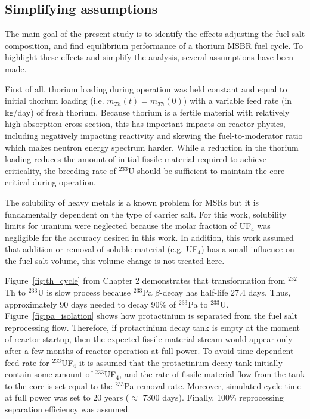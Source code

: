 \subsection{Simplifying assumptions}
The main goal of the present study is to identify the effects adjusting the fuel salt composition, and find equilibrium performance of a thorium \gls{MSBR} fuel cycle. To highlight these effects and simplify the analysis, several assumptions have been made.

First of all, thorium loading during operation was held constant and equal to initial thorium loading (i.e. $m_{Th}(t)=m_{Th}(0)$) with a variable feed rate (in kg/day) of fresh thorium. Because thorium is a fertile material with relatively high absorption cross section, this has important impacts on reactor physics, including negatively impacting reactivity and skewing the fuel-to-moderator ratio which makes neutron energy spectrum harder. While a reduction in the thorium loading reduces the amount of initial fissile material required to achieve criticality, the breeding rate of $^{233}$U should be sufficient to maintain the core critical during operation.

The solubility of heavy metals is a known problem for \glspl{MSR} but it is fundamentally dependent on the type of carrier salt. For this work, solubility limits for uranium were neglected because the molar fraction of UF$_4$ was negligible for the accuracy desired in this work. In addition, this work assumed that addition or removal of soluble material (e.g. UF$_4$) has a small influence on the fuel salt volume, this volume change is not treated here.

Figure~\ref{fig:th_cycle} from Chapter 2 demonstrates that transformation from $^{232}$Th to $^{233}$U is slow process because $^{233}$Pa $\beta$-decay has half-life 27.4 days. Thus, approximately 90 days needed to decay 90\% of $^{233}$Pa to $^{233}$U. Figure~\ref{fig:pa_isolation} shows how protactinium is separated from the fuel salt reprocessing flow. Therefore, if protactinium decay tank is empty at the moment of reactor startup, then the expected fissile material stream would appear only after a few months of reactor operation at full power. To avoid time-dependent feed rate for $^{233}$UF$_4$ it is assumed that the protactinium decay tank initially contain some amount of $^{233}$UF$_4$, and the rate of fissile material flow from the tank to the core is set equal to the $^{233}$Pa removal rate. Moreover, simulated cycle time at full power was set to 20 years ($\approx$ 7300 days). Finally, 100\% reprocessing separation efficiency was assumed.

